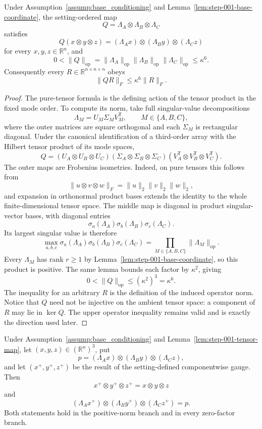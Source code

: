 \begin{lemma}
\label{lem:step-001-tensor-map}
Under Assumption~\ref{assump:base_conditioning} and
Lemma~\ref{lem:step-001-base-coordinate}, the setting-ordered map
\[
Q=\Lambda_A\otimes\Lambda_B\otimes\Lambda_C
\]
satisfies
\[
Q(x\otimes y\otimes z)
=(\Lambda_Ax)\otimes(\Lambda_By)\otimes(\Lambda_Cz)
\]
for every $x,y,z\in\mathbb R^n$, and
\[
0<\|Q\|_{\mathrm{op}}
=\|\Lambda_A\|_{\mathrm{op}}
 \|\Lambda_B\|_{\mathrm{op}}
 \|\Lambda_C\|_{\mathrm{op}}
\leq\kappa^6.
\]
Consequently every $R\in\mathbb R^{n\times n\times n}$ obeys
\[
\|QR\|_F\leq\kappa^6\|R\|_F.
\]
\end{lemma}

\begin{proof}
The pure-tensor formula is the defining action of the tensor product in the
fixed mode order.  To compute its norm, take full singular-value
decompositions
\[
\Lambda_M=U_M\Sigma_MV_M^{\mathsf T},
\qquad M\in\{A,B,C\},
\]
where the outer matrices are square orthogonal and each $\Sigma_M$ is
rectangular diagonal.  Under the canonical identification of a third-order
array with the Hilbert tensor product of its mode spaces,
\[
Q=(U_A\otimes U_B\otimes U_C)
  (\Sigma_A\otimes\Sigma_B\otimes\Sigma_C)
  (V_A^{\mathsf T}\otimes V_B^{\mathsf T}\otimes V_C^{\mathsf T}).
\]
The outer maps are Frobenius isometries.  Indeed, on pure tensors this follows
from
\[
\|u\otimes v\otimes w\|_F=\|u\|_2\|v\|_2\|w\|_2,
\]
and expansion in orthonormal product bases extends the identity to the whole
finite-dimensional tensor space.  The middle map is diagonal in product
singular-vector bases, with diagonal entries
\[
\sigma_a(\Lambda_A)\sigma_b(\Lambda_B)\sigma_c(\Lambda_C).
\]
Its largest singular value is therefore
\[
\max_{a,b,c}
\sigma_a(\Lambda_A)\sigma_b(\Lambda_B)\sigma_c(\Lambda_C)
=\prod_{M\in\{A,B,C\}}\|\Lambda_M\|_{\mathrm{op}}.
\]
Every $\Lambda_M$ has rank $r\geq1$ by
Lemma~\ref{lem:step-001-base-coordinate}, so this product is positive.
The same lemma bounds each factor by $\kappa^2$, giving
\[
0<\|Q\|_{\mathrm{op}}\leq(\kappa^2)^3=\kappa^6.
\]
The inequality for an arbitrary $R$ is the definition of the induced
operator norm.  Notice that $Q$ need not be injective on the ambient tensor
space: a component of $R$ may lie in $\ker Q$.  The upper operator inequality
remains valid and is exactly the direction used later.
\end{proof}

\begin{lemma}
\label{lem:step-001-gauge}
Under Assumption~\ref{assump:base_conditioning} and
Lemma~\ref{lem:step-001-tensor-map}, let $(x,y,z)\in(\mathbb R^n)^3$, put
\[
p=(\Lambda_Ax)\otimes(\Lambda_By)\otimes(\Lambda_Cz),
\]
and let $(x^+,y^+,z^+)$ be the result of the setting-defined componentwise
gauge.  Then
\[
x^+\otimes y^+\otimes z^+=x\otimes y\otimes z
\]
and
\[
(\Lambda_Ax^+)\otimes(\Lambda_By^+)\otimes(\Lambda_Cz^+)=p.
\]
Both statements hold in the positive-norm branch and in every zero-factor
branch.
\end{lemma}

